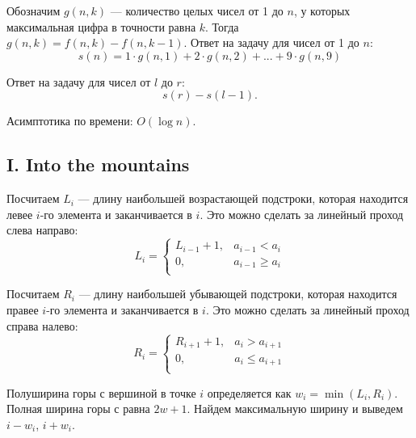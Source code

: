 \documentclass[10pt, a4paper]{article}
\begin{document}
Обозначим $g(n, k)$ --- количество целых чисел от 1 до $n$, у которых максимальная цифра в точности равна $k$. Тогда $g(n, k) = f(n, k) - f(n, k - 1)$. Ответ на задачу для чисел от 1 до $n$:
$$ s(n) = 1 \cdot g(n, 1) + 2 \cdot g(n, 2) + ... + 9 \cdot g(n, 9)$$

Ответ на задачу для чисел от $l$ до $r$:
$$ s(r) - s(l - 1).$$

Асимптотика по времени: $O(\log n)$.





\subsection*{I. Into the mountains}

Посчитаем $L_i$ --- длину наибольшей возрастающей подстроки, которая находится левее $i$-го элемента и заканчивается в $i$. Это можно сделать за линейный проход слева направо:
$$
L_i =
\begin{cases}
L_{i-1} + 1, & a_{i-1} < a_i \\
0, & a_{i-1} \geqslant a_i \\
\end{cases}
$$

Посчитаем $R_i$ --- длину наибольшей убывающей подстроки, которая находится правее $i$-го элемента и заканчивается в $i$. Это можно сделать за линейный проход справа налево:
$$
R_i =
\begin{cases}
R_{i+1} + 1, & a_{i} > a_{i + 1} \\
0, & a_{i} \leqslant a_{i + 1} \\
\end{cases}
$$

Полуширина горы с вершиной в точке $i$ определяется как $w_i = \min(L_i, R_i)$. Полная ширина горы с равна $2 w + 1$. Найдем максимальную ширину и выведем $i - w_i$, $i + w_i$.


\end{document}
